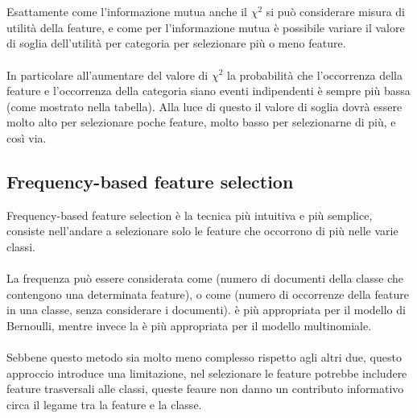\documentclass{article}
\theoremstyle{plain}
\theoremstyle{definition}
\begin{document}
\\
\\
Esattamente come l'informazione mutua anche il $\chi^2$ si può considerare misura di utilità della feature, e come per l'informazione mutua è possibile variare il valore di soglia dell'utilità per categoria per selezionare più o meno feature. 
\\
\\
In particolare all'aumentare del valore di $\chi^2$ la probabilità che l'occorrenza della feature e l'occorrenza della categoria siano eventi indipendenti è sempre più bassa (come mostrato nella tabella). Alla luce di questo il valore di soglia dovrà essere molto alto per selezionare poche feature, molto basso per selezionarne di più, e così via.
\subsection{Frequency-based feature selection}
Frequency-based feature selection è la tecnica più intuitiva e più semplice, consiste nell'andare a selezionare solo le feature che occorrono di più nelle varie classi. 
\\
\\
La frequenza può essere considerata come  (numero di documenti della classe che contengono una determinata feature), o come  (numero di occorrenze della feature in una classe, senza considerare i documenti).
 è più appropriata per il modello di Bernoulli, mentre invece la  è più appropriata per il modello multinomiale. 
\\
\\
Sebbene questo metodo sia molto meno complesso rispetto agli altri due, questo approccio introduce una limitazione, nel selezionare le feature potrebbe includere feature trasversali alle classi, queste feaure non danno un contributo informativo circa il legame tra la feature e la classe.

\newpage
\end{document}
